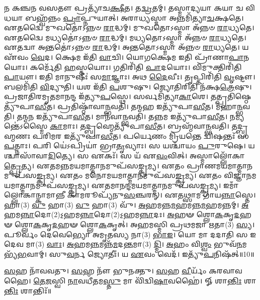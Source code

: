 𑌨 𑌕𑌞𑍍𑌚𑌨 𑌵𑌸𑌤𑍗 𑌪𑍍𑌰𑌤𑍍𑌯𑌾᳴𑌚\-\ul{𑌕𑍍𑌷𑍀}\-𑌤। 
𑌤\-\ul{𑌦𑍍𑌵𑍍𑌰}\-𑌤𑌮𑍍। 
𑌤𑌸𑍍𑌮𑌾𑌦𑍍𑌯𑌯𑌾 𑌕𑌯𑌾 𑌚 𑌵𑌿𑌧𑌯𑌾 𑌬𑌹𑍍𑌵᳴𑌨𑍍𑌨𑌂 \ul{𑌪𑍍𑌰𑌾}\-𑌪𑍍𑌨𑍁𑌯𑌾𑌤𑍍। 
𑌅𑌰𑌾𑌧𑍍𑌯𑌸𑍍𑌮𑌾 𑌅𑌨𑍍𑌨𑌮𑌿᳴𑌤𑍍𑌯𑌾\-\ul{𑌚}\-𑌕𑍍𑌷𑌤𑍇। 
𑌏𑌤𑌦𑍍𑌵𑍈 𑌮𑍁𑌖𑌤𑍋॑𑌽𑌨𑍍𑌨𑍞 \ul{𑌰𑌾}\-𑌦𑍍𑌧𑌮𑍍। 
𑌮𑍁𑌖𑌤𑍋𑌽𑌸𑍍𑌮𑌾 𑌅᳴𑌨𑍍𑌨𑍞 \ul{𑌰𑌾}\-𑌧𑍍𑌯𑌤𑍇। 
𑌏𑌤𑌦𑍍𑌵𑍈 𑌮𑌧𑍍𑌯𑌤𑍋॑𑌽𑌨𑍍𑌨𑍞 \ul{𑌰𑌾}\-𑌦𑍍𑌧𑌮𑍍। 
𑌮𑌧𑍍𑌯𑌤𑍋𑌽𑌸𑍍𑌮𑌾 𑌅᳴𑌨𑍍𑌨𑍞 \ul{𑌰𑌾}\-𑌧𑍍𑌯𑌤𑍇। 
𑌏𑌤𑌦𑍍𑌵𑌾 𑌅𑌨𑍍𑌤𑌤𑍋॑𑌽𑌨𑍍𑌨𑍞 \ul{𑌰𑌾}\-𑌦𑍍𑌧𑌮𑍍। 
𑌅𑌨𑍍𑌤𑌤𑍋𑌽𑌸𑍍𑌮𑌾 𑌅᳴𑌨𑍍𑌨𑍞 \ul{𑌰𑌾}\-𑌧𑍍𑌯𑌤𑍇। 
𑌯 𑌏᳴𑌵𑌂 \ul{𑌵𑍇}\-𑌦। 
𑌕𑍍𑌷𑍇𑌮 𑌇᳴𑌤𑌿 \ul{𑌵𑌾}\-𑌚𑌿। 
𑌯𑍋𑌗𑌕𑍍𑌷𑍇𑌮 𑌇𑌤𑌿 𑌪𑍍𑌰𑌾᳴𑌣𑌾\-\ul{𑌪𑌾}\-𑌨𑌯𑍋𑌃। 
𑌕𑌰𑍍𑌮𑍇᳴𑌤𑌿 \ul{𑌹}\-𑌸𑍍𑌤𑌯𑍋𑌃। 
𑌗𑌤𑌿𑌰𑌿᳴𑌤𑌿 \ul{𑌪𑌾}\-𑌦𑌯𑍋𑌃। 
𑌵𑌿𑌮𑍁𑌕𑍍𑌤𑌿𑌰𑌿᳴𑌤𑌿 \ul{𑌪𑌾}\-𑌯𑍗। 
𑌇𑌤𑌿 𑌮𑌾𑌨𑍁𑌷𑍀𑌃॑ 𑌸\-\ul{𑌮𑌾}\-𑌜𑍍𑌞𑌾𑌃। 
𑌅𑌥 \ul{𑌦𑍈}\-𑌵𑍀𑌃। 
𑌤𑍃𑌪𑍍𑌤𑌿𑌰𑌿᳴𑌤𑌿 \ul{𑌵𑍃}\-𑌷𑍍𑌟𑍗। 
𑌬𑌲𑌮𑌿᳴𑌤𑌿 \ul{𑌵𑌿}\-𑌦𑍍𑌯𑍁𑌤𑌿। 
𑌯𑌶 𑌇᳴𑌤𑌿 \ul{𑌪}\-𑌶𑍁𑌷𑍁। 
𑌜𑍍𑌯𑍋𑌤𑌿𑌰𑌿𑌤𑌿 𑌨᳴𑌕𑍍𑌷\-\ul{𑌤𑍍𑌰𑍇}\-𑌷𑍁। 
𑌪𑍍𑌰𑌜𑌾𑌤𑌿𑌰𑌮𑍃𑌤𑌮𑌾𑌨𑌨𑍍𑌦 𑌇᳴𑌤𑍍𑌯𑍁\-\ul{𑌪}\-𑌸𑍍𑌥𑍇। 
𑌸𑌰𑍍𑌵𑌮𑌿᳴𑌤𑍍𑌯𑌾\-\ul{𑌕𑌾}\-𑌶𑍇। 
𑌤𑌤𑍍𑌪𑍍𑌰𑌤𑌿\-𑌷𑍍𑌠𑍇𑌤𑍍𑌯𑍁᳴𑌪𑌾\-\ul{𑌸𑍀}\-𑌤। 
𑌪𑍍𑌰𑌤𑌿\-𑌷𑍍𑌠𑌾᳴𑌵𑌾\-\ul{𑌨𑍍𑌭}\-𑌵𑌤𑌿। 
𑌤𑌨𑍍𑌮𑌹 𑌇𑌤𑍍𑌯𑍁᳴𑌪𑌾\-\ul{𑌸𑍀}\-𑌤। 
𑌮᳴𑌹𑌾\-\ul{𑌨𑍍𑌭}\-𑌵𑌤𑌿। 
𑌤𑌨𑍍𑌮𑌨 𑌇𑌤𑍍𑌯𑍁᳴𑌪𑌾\-\ul{𑌸𑍀}\-𑌤। 
𑌮𑌾𑌨᳴𑌵𑌾\-\ul{𑌨𑍍𑌭}\-𑌵𑌤𑌿। 
𑌤𑌨𑍍𑌨𑌮 𑌇𑌤𑍍𑌯𑍁᳴𑌪𑌾\-\ul{𑌸𑍀}\-𑌤। 
𑌨𑌮𑍍𑌯𑌨𑍍𑌤𑍇॑𑌽𑌸𑍍𑌮𑍈 \ul{𑌕𑌾}\-𑌮𑌾𑌃। 
𑌤𑌦𑍍𑌬𑍍𑌰𑌹𑍍𑌮𑍇𑌤𑍍𑌯𑍁᳴𑌪𑌾\-\ul{𑌸𑍀}\-𑌤। 
𑌬𑍍𑌰𑌹𑍍𑌮᳴𑌵𑌾\-\ul{𑌨𑍍𑌭}\-𑌵𑌤𑌿। 
𑌤𑌦𑍍𑌬𑍍𑌰𑌹𑍍𑌮𑌣𑌃 𑌪𑌰𑌿𑌮𑌰 𑌇𑌤𑍍𑌯𑍁᳴𑌪𑌾\-\ul{𑌸𑍀}\-𑌤। 
𑌪𑌰𑍍𑌯𑍇𑌣𑌂 𑌮𑍍𑌰𑌿𑌯𑌨𑍍𑌤𑍇 𑌦𑍍𑌵𑌿𑌷𑌨𑍍𑌤𑌃᳴ 𑌸\-\ul{𑌪}\-𑌤𑍍𑌨𑌾𑌃। 
𑌪𑌰𑌿 𑌯𑍇॑𑌽𑌪𑍍𑌰𑌿𑌯𑌾॑ 𑌭𑍍𑌰𑌾\-\ul{𑌤𑍃}\-𑌵𑍍𑌯𑌾𑌃। 
𑌸 𑌯𑌶𑍍𑌚𑌾᳴𑌯𑌂 \ul{𑌪𑍁}\-𑌰𑍁𑌷𑍇। 
𑌯𑌶𑍍𑌚𑌾𑌸𑌾᳴𑌵𑌾\-\ul{𑌦𑌿}\-𑌤𑍍𑌯𑍇। 
𑌸 𑌏𑌕𑌃᳴। 
𑌸 𑌯᳴ 𑌏\-\ul{𑌵𑌂}\-𑌵𑌿𑌤𑍍। 
𑌅𑌸𑍍𑌮𑌾𑌲𑍍𑌲𑍋᳴𑌕𑌾\-\ul{𑌤𑍍𑌪𑍍𑌰𑍇}\-𑌤𑍍𑌯। 
𑌏𑌤𑌮𑌨𑍍𑌨𑌮𑌯𑌮𑌾𑌤𑍍𑌮𑌾𑌨𑌮𑍁𑌪᳴𑌸\-\ul{𑌙𑍍𑌕𑍍𑌰}\-𑌮𑍍𑌯। 
𑌏𑌤𑌂 𑌪𑍍𑌰𑌾𑌣𑌮𑌯𑌮𑌾𑌤𑍍𑌮𑌾𑌨𑌮𑍁𑌪᳴𑌸\-\ul{𑌙𑍍𑌕𑍍𑌰}\-𑌮𑍍𑌯। 
𑌏𑌤𑌂 𑌮𑌨𑍋𑌮𑌯𑌮𑌾𑌤𑍍𑌮𑌾𑌨𑌮𑍁𑌪᳴\-𑌸\-\ul{𑌙𑍍𑌕𑍍𑌰}\-𑌮𑍍𑌯। 
𑌏𑌤𑌂 𑌵𑌿𑌜𑍍𑌞𑌾𑌨𑌮𑌯𑌮𑌾𑌤𑍍𑌮𑌾𑌨𑌮𑍁𑌪᳴\-𑌸\-\ul{𑌙𑍍𑌕𑍍𑌰}\-𑌮𑍍𑌯। 
𑌏𑌤𑌮𑌾𑌨𑌨𑍍𑌦𑌮𑌯\-𑌮𑌾𑌤𑍍𑌮𑌾𑌨𑌮𑍁𑌪᳴𑌸\-\ul{𑌙𑍍𑌕𑍍𑌰}\-𑌮𑍍𑌯। 
𑌇𑌮𑌾𑌁𑌲𑍍𑌲𑍋𑌕𑌾𑌨𑍍𑌕𑌾𑌮𑌾𑌨𑍍𑌨𑍀 𑌕𑌾𑌮𑌰𑍂𑌪𑍍𑌯᳴𑌨𑍁\-\-\ul{𑌸}\-𑌞𑍍𑌚𑌰𑌨𑍍। 
𑌏𑌤𑌥𑍍𑌸𑌾𑌮 𑌗𑌾᳴𑌯\-\ul{𑌨𑍍𑌨𑌾}\-𑌸𑍍𑌤𑍇। 
𑌹𑌾(3) \ul{𑌵𑍁} 𑌹𑌾(3) \ul{𑌵𑍁} 𑌹𑌾(3) 𑌵𑍁᳴। 
\-\ul{𑌅}\-𑌹𑌮𑌨𑍍𑌨\-\ul{𑌮}\-𑌹𑌮𑌨𑍍𑌨\-\ul{𑌮}\-𑌹𑌮𑌨𑍍𑌨𑌮𑍍। 
\-\ul{𑌅}\-𑌹𑌮\-\ul{𑌨𑍍𑌨𑌾}\-𑌦𑍋(2)\-𑌽॒𑌹𑌮\-\ul{𑌨𑍍𑌨𑌾}\-𑌦𑍋(2)\-𑌽॒𑌹𑌮\-\ul{𑌨𑍍𑌨𑌾}\-𑌦𑌃। 
\-\ul{𑌅}\-𑌹𑍟 𑌶𑍍𑌲𑍋\-\ul{𑌕}\-𑌕𑍃\-\ul{𑌦}\-𑌹𑍟 𑌶𑍍𑌲𑍋\-\ul{𑌕}\-𑌕𑍃\-\ul{𑌦}\-𑌹𑍟 𑌶𑍍𑌲𑍋\-\ul{𑌕}\-𑌕𑍃𑌤𑍍। 
𑌅𑌹𑌮𑌸𑍍𑌮𑌿 𑌪𑍍𑌰𑌥𑌮𑌜𑌾 𑌋𑌤𑌾(3) \ul{𑌸𑍍𑌯}\-। 
𑌪𑍂𑌰𑍍𑌵𑌂 𑌦𑍇𑌵𑍇𑌭𑍍𑌯𑍋 𑌅𑌮𑍃𑌤𑌸𑍍𑌯 𑌨𑌾(3) \ul{𑌭𑌾}\-\-\ul{𑌇}\-। 
𑌯𑍋 𑌮𑌾 𑌦𑌦𑌾𑌤𑌿 𑌸 𑌇𑌦𑍇𑌵 𑌮𑌾(3) \ul{𑌵𑌾𑌃}\-। 
\-\ul{𑌅}\-𑌹𑌮\-\ul{𑌨𑍍𑌨}\-𑌮𑌨𑍍𑌨᳴\-\ul{𑌮}\-𑌦\-\ul{𑌨𑍍𑌤}\-𑌮𑌾(3) \ul{𑌦𑍍𑌮𑌿}\-। 
\-\ul{𑌅}\-𑌹𑌂 𑌵𑌿\-\ul{𑌶𑍍𑌵𑌂} 𑌭𑍁𑌵᳴\-\ul{𑌨}\-𑌮𑌭𑍍𑌯᳴\-\ul{𑌭}\-𑌵𑌾𑌮𑍍। 
𑌸𑍁\-\ul{𑌵}\-𑌰𑍍𑌨 𑌜𑍍𑌯𑍋𑌤𑍀𑌃॑। 
𑌯 \ul{𑌏}\-𑌵𑌂 𑌵𑍇𑌦᳴। 
𑌇𑌤𑍍𑌯𑍁᳴\-\ul{𑌪}\-𑌨𑌿𑌷᳴𑌤𑍍॥10॥

\-\ul{𑌸}\-𑌹 𑌨𑌾᳴𑌵𑌵𑌤𑍁। 
\-\ul{𑌸}\-𑌹 𑌨𑍗᳴ 𑌭𑍁𑌨𑌕𑍍𑌤𑍁। 
\-\ul{𑌸}\-𑌹 \ul{𑌵𑍀}\-𑌰𑍍𑌯𑌂᳴ 𑌕𑌰𑌵𑌾𑌵𑌹𑍈। 
\-\ul{𑌤𑍇}\-\-\ul{𑌜}\-𑌸𑍍𑌵𑌿 \ul{𑌨𑌾}\-𑌵𑌧𑍀᳴𑌤𑌮\-\ul{𑌸𑍍𑌤𑍁} 𑌮𑌾 𑌵𑌿᳴𑌦𑍍𑌵𑌿\-\ul{𑌷𑌾}\-𑌵𑌹𑍈॑। 
𑍐 𑌶𑌾\-\ul{𑌨𑍍𑌤𑌿𑌃} 𑌶𑌾\-\ul{𑌨𑍍𑌤𑌿𑌃} 𑌶𑌾𑌨𑍍𑌤𑌿𑌃᳴॥
\closesection



